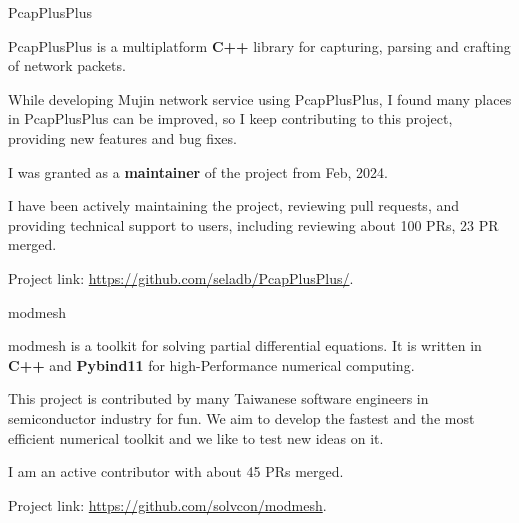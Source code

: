 
\vspace{-2mm}

\begin{cventries}

  \cventry
    {} %
    {PcapPlusPlus} %
    {} %
    {} %
    {
      \vspace{-2mm}
      \begin{cvitems} %
        \item {PcapPlusPlus is a multiplatform \textbf{C++} library for capturing, parsing and crafting of network packets.}
        \item {While developing Mujin network service using PcapPlusPlus, I found many places in PcapPlusPlus can be improved,
        so I keep contributing to this project, providing new features and bug fixes.}
        \item {I was granted as a \textbf{maintainer} of the project from Feb, 2024.}
        \item {I have been actively maintaining the project, reviewing pull requests, and providing technical support to users, including reviewing about 100 PRs, 23 PR merged.}
        \item {Project link: \url{https://github.com/seladb/PcapPlusPlus/}.}
      \end{cvitems}
    }
  \vspace{-2mm}

  \cventry
    {} %
    {modmesh} %
    {} %
    {} %
    {
      \vspace{-2mm}
      \begin{cvitems} %
        \item { modmesh is a toolkit for solving partial differential equations. It is written in \textbf{C++} and \textbf{Pybind11} for high-Performance
        numerical computing.}
        \item { This project is contributed by many Taiwanese software engineers in semiconductor industry for fun. We aim to develop the fastest and the most efficient numerical toolkit and we like to test new ideas on it.}
        \item {I am an active contributor with about 45 PRs merged.}
        \item {Project link: \url{https://github.com/solvcon/modmesh}.}
      \end{cvitems}
    }
    \vspace{-2mm}


\end{cventries}
